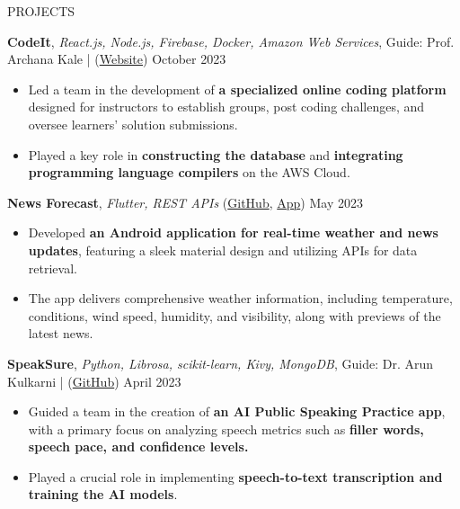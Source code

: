 \documentclass{resume} %
\begin{document}

\begin{rSection}{PROJECTS}
    \vspace{-1.25em}
    \item \textbf{CodeIt}, \textit{React.js, Node.js, Firebase, Docker, Amazon Web Services}, Guide: Prof. Archana Kale | (\href{https://codeit-web.onrender.com/}{Website}) \hfill {October 2023}
    \begin{itemize}
        \setlength\itemsep{-0.6em}
        \item Led a team in the development of \textbf{a specialized online coding platform} designed for instructors to establish groups, post coding challenges, and oversee learners' solution submissions.
        \item Played a key role in \textbf{constructing the database} and \textbf{integrating programming language compilers} on the AWS Cloud.
    \end{itemize}
    \item \textbf{News Forecast}, \textit{Flutter, REST APIs} (\href{https://github.com/ninadnaik10/news-forecast}{GitHub}, \href{https://github.com/ninadnaik10/News-Forecast/releases}{App}) \hfill {May 2023}
    \begin{itemize}
        \setlength\itemsep{-0.6em}
        \item Developed \textbf{an Android application for real-time weather and news updates}, featuring a sleek material design and utilizing APIs for data retrieval.
        \item The app delivers comprehensive weather information, including temperature, conditions, wind speed, humidity, and visibility, along with previews of the latest news.
    \end{itemize}
    \item \textbf{SpeakSure}, \textit{Python, Librosa, scikit-learn, Kivy, MongoDB}, Guide: Dr. Arun Kulkarni | (\href{https://github.com/ninadnaik10/SpeakSure} {GitHub}) \hfill {April 2023}
    \begin{itemize}
        \setlength\itemsep{-0.6em}
        \item  Guided a team in the creation of \textbf{an AI Public Speaking Practice app}, with a primary focus on analyzing speech metrics such as \textbf{filler words, speech pace, and confidence levels.}
        \item Played a crucial role in implementing \textbf{speech-to-text transcription and training the AI models}.

\end{itemize}
\end{rSection}
\end{document}
